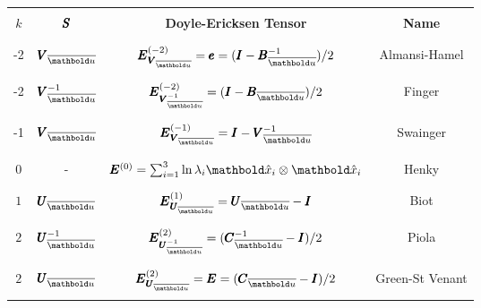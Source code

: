 \begin{table}[!htt]
\small
\centering
\begin{tabular}{|c|c|c|c|}
\hline
& & &\\
\textbf{   $k$   } & $\pmb{S}$  &\textbf{  Doyle-Ericksen Tensor    } & \textbf{   Name   } \\
& & & \\
\hline
& & & \\
-2 & $\tnr{V}_{\overline{\vto{u}}}$   & $\tnr{E}_{\tnr{V}_{\overline{\vto{u}}}}^{(-2)}=\tnr{e}=(\tnr{I} - \tnr{B}^{-1}_{\overline{\vto{u}}})/2$   & Almansi-Hamel\\
& & & \\
\hline
& & & \\
-2 & $\tnr{V}^{-1}_{\overline{\vto{u}}}$  & $\tnr{E}_{\tnr{V}^{-1}_{\overline{\vto{u}}}}^{(-2)}=(\tnr{I} - \tnr{B}_{\overline{\vto{u}}})/2$   & Finger\index{strain!Finger} \\
& & & \\
\hline
& & & \\
-1 & $\tnr{V}_{\overline{\vto{u}}}$  & $\tnr{E}_{\tnr{V}_{\overline{\vto{u}}}}^{(-1)}=\tnr{I} - \tnr{V}^{-1}_{\overline{\vto{u}}}$   & Swainger\index{strain!Swainger} \\
& & & \\
\hline
& & &\\
$0$ & - & $\tnr{E}^{(0)}=\sum_{i=1}^3\ln\lambda_i\vun{x}_{i}\otimes\vun{x}_{i}$   & Henky\index{strain!Henky} \\
& & &\\
\hline
& & &\\
$1$ &  $\tnr{U}_{\overline{\vto{u}}}$ &$\tnr{E}_{\tnr{U}_{\overline{\vto{u}}}}^{(1)}=\tnr{U}_{\overline{\vto{u}}}-\tnr{I}$ & Biot\index{Biot!tensor medida de} \\
& & &\\
\hline
& & & \\
$2$ & $\tnr{U}^{-1}_{\overline{\vto{u}}}$ & $\tnr{E}_{\tnr{U}^{-1}_{\overline{\vto{u}}}}^{(2)}=(\tnr{C}^{-1}_{\overline{\vto{u}}}-\tnr{I})/2$ & Piola\index{strain!Piola} \\
& & &\\
\hline
& & &\\
$2$ & $\tnr{U}_{\overline{\vto{u}}}$ & $\tnr{E}_{\tnr{U}_{\overline{\vto{u}}}}^{(2)}=\tnr{E}=(\tnr{C}_{\overline{\vto{u}}}-\tnr{I})/2$ & Green-St Venant\\
& & & \\
\hline
\end{tabular}
\vspace{9pt}
\label{tb:strains}
\end{table}

